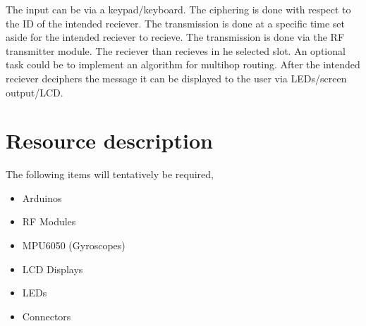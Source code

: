 \documentclass[12pt]{article}
\begin{document}
 The input can be via a keypad/keyboard. The ciphering is done with respect to the ID of the intended reciever. The transmission is done at a specific time set aside for the intended reciever to recieve. The transmission is done via the RF transmitter module. The reciever than recieves in he selected slot. An optional task could be to implement an algorithm for multihop routing. After the intended reciever deciphers the message it can be displayed to the user via LEDs/screen output/LCD. 
 
 \section{Resource description}
 
 The following items will tentatively be required,
 
 \begin{itemize}
 \item Arduinos
 \item RF Modules
 \item MPU6050 (Gyroscopes)
 \item LCD Displays
 \item LEDs
 \item Connectors
 \end{itemize}


 
\end{document}
